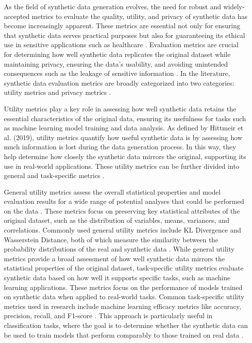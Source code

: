 \documentclass{article}
\begin{document}
As the field of synthetic data generation evolves, the need for robust and widely-accepted metrics to evaluate the quality, utility, and privacy of synthetic data has become increasingly apparent. These metrics are essential not only for ensuring that synthetic data serves practical purposes but also for guaranteeing its ethical use in sensitive applications such as healthcare \parencite{kaabachi_scoping_2024}. Evaluation metrics are crucial for determining how well synthetic data replicates the original dataset while maintaining privacy, ensuring the data’s usability, and avoiding unintended consequences such as the leakage of sensitive information \parencite{jordon_synthetic_2022,kaabachi_scoping_2024}. In the literature, synthetic data evaluation metrics are broadly categorized into two categories: utility metrics and privacy metrics \parencite{goncalves_generation_2020,kaabachi_scoping_2024}. 

Utility metrics play a key role in assessing how well synthetic data retains the essential characteristics of the original data, ensuring its usefulness for tasks such as machine learning model training and data analysis. As defined by Hittmeir et al. (2019), utility metrics quantify how useful synthetic data is by assessing how much information is lost during the data generation process.  In this way, they help determine how closely the synthetic data mirrors the original, supporting its use in real-world applications. These utility metrics can be further divided into general and task-specific metrics \parencite{kaabachi_scoping_2024,osorio-marulanda_privacy_2024}.

General utility metrics assess the overall statistical properties and model evaluation results for a wide range of potential analyses that could be performed on the data \parencite{el_emam_seven_2020}. These metrics focus on preserving key statistical attributes of the original dataset, such as the distribution of variables, means, variances, and correlations. Commonly used general utility metrics include KL Divergence and Wasserstein Distance, both of which measure the similarity between the probability distributions of the real and synthetic data \parencite{fonseca_tabular_2023}. While general utility metrics provide a broad assessment of how well synthetic data mirrors the statistical properties of the original dataset, task-specific utility metrics evaluate synthetic data based on how well it supports specific tasks, such as machine learning applications. These metrics focus on the performance of models trained on synthetic data when applied to real-world tasks. Common task-specific utility metrics used in research include machine learning efficacy metrics like accuracy, precision, recall, and F1-score \parencite{figueira_survey_2022}. This approach is particularly useful in classification tasks, where the goal is to determine whether the synthetic data can be used to train models that perform comparably to those trained on real data \parencite{kaabachi_scoping_2024}. 
\end{document}
